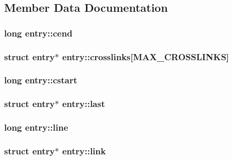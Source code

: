 \subsection{Member Data Documentation}
\hypertarget{structentry_a22144edd8a9caa3ac988cc0b4d1a039d}{
\subsubsection[{cend}]{\setlength{\rightskip}{0pt plus 5cm}long entry\-::cend}}\label{structentry_a22144edd8a9caa3ac988cc0b4d1a039d}
\hypertarget{structentry_a2536efb4714caefb0b9fbef8de54fb4d}{
\subsubsection[{crosslinks}]{\setlength{\rightskip}{0pt plus 5cm}struct {\bf entry}$\ast$ entry\-::crosslinks\mbox{[}{\bf M\-A\-X\-\_\-\-C\-R\-O\-S\-S\-L\-I\-N\-K\-S}\mbox{]}}}\label{structentry_a2536efb4714caefb0b9fbef8de54fb4d}
\hypertarget{structentry_a3963df64fffa3b62ca7da5945e085f37}{
\subsubsection[{cstart}]{\setlength{\rightskip}{0pt plus 5cm}long entry\-::cstart}}\label{structentry_a3963df64fffa3b62ca7da5945e085f37}
\hypertarget{structentry_a18d98d27a6599f7d645e3096f01812f5}{
\subsubsection[{last}]{\setlength{\rightskip}{0pt plus 5cm}struct {\bf entry}$\ast$ entry\-::last}}\label{structentry_a18d98d27a6599f7d645e3096f01812f5}
\hypertarget{structentry_a536059da6a4f904c4133f255b3135558}{
\subsubsection[{line}]{\setlength{\rightskip}{0pt plus 5cm}long entry\-::line}}\label{structentry_a536059da6a4f904c4133f255b3135558}
\hypertarget{structentry_a6e74ef745be8d53435a6b5b8daf1a8a6}{
\subsubsection[{link}]{\setlength{\rightskip}{0pt plus 5cm}struct {\bf entry}$\ast$ entry\-::link}}\label{structentry_a6e74ef745be8d53435a6b5b8daf1a8a6}
